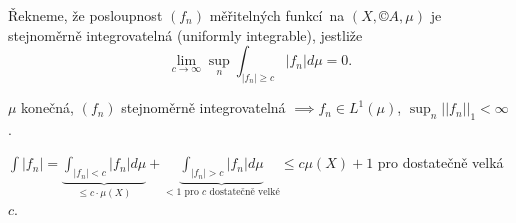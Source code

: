 \documentclass[12pt]{article}					%
\begin{document}

\begin{definice}
	Řekneme, že posloupnost $(f_n)$ měřitelných funkcí na $(X, ©A, \mu)$ je stejnoměrně integrovatelná (uniformly integrable), jestliže
	$$ \lim_{c \rightarrow ∞} \sup_n \int_{|f_n| ≥ c} |f_n| d\mu = 0. $$
\end{definice}

\begin{tvrzeni}
	$\mu$ konečná, $(f_n)$ stejnoměrně integrovatelná $\implies f_n \in L^1(\mu)$, $\sup_n ||f_n||_1 < ∞$.

	\begin{dukazin}
		$\int |f_n| = \underbrace{\int_{|f_n| < c} |f_n| d\mu}_{≤ c · \mu(X)} + \underbrace{\int_{|f_n| > c} |f_n| d\mu}_{<1\text{ pro $c$ dostatečně velké}} ≤ c \mu(X) + 1$ pro dostatečně velká $c$.
	\end{dukazin}
\end{tvrzeni}
\end{document}
